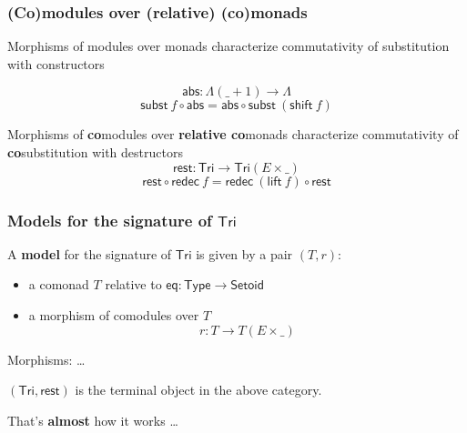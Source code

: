 \documentclass[
]
{beamer}
\newcommand{\constfont}[1]{\ensuremath{\mathsf{#1}}}
\newcommand{\bind}[2]{{#1}\mathbin{\gg\hspace{-.8ex}=}{#2}}
\newcommand{\Tri}{\constfont{Tri}}
\newcommand{\tail}{\constfont{rest}}
\newcommand{\redec}{\constfont{redec}}
\newcommand{\comp}[2]{\ensuremath{{#2} \circ {#1}}}
\newcommand{\shift}{\constfont{shift}}
\newcommand{\lift}{\constfont{lift}}
\newcommand{\subst}{\constfont{subst}}
\newcommand{\Setoid}{\constfont{Setoid}}
\newcommand{\eq}{\ensuremath{\mathsf{eq}}}
\newcommand{\App}{\constfont{app}}
\newcommand{\Abs}{\constfont{abs}}
\newcommand{\LC}{{\Lambda}}
\newcommand{\Set}{\constfont{Type}}
\newcommand{\fat}[1]{\textbf{#1}}
\begin{document}
\begin{frame}
 \frametitle{(Co)modules over (relative) (co)monads}
 \begin{block}{Morphisms of modules over monads}
   characterize commutativity of substitution with constructors

         \[ \Abs : \LC(\_ + 1) \to \LC \]
         \[ \comp{\Abs}{\subst~f} = \comp{\subst~(\shift~f)}{\Abs} \]
 \end{block}

 \begin{block}{Morphisms of \fat{co}modules over \fat{relative co}monads}
   characterize commutativity of \fat{co}substitution with destructors
         \[\tail : \Tri \to \Tri(E\times \_)\]
         \[\comp{\redec~f}{\tail} = \comp{\tail}{\redec~(\lift~f)} \]
 \end{block} 
\end{frame}

\begin{frame}
 \frametitle{Models for the signature of $\Tri$}
  \begin{definition}
    A \fat{model} for the signature of $\Tri$ is given by a pair $(T,r)$:
    \begin{itemize}
     \item a comonad $T$ relative to $\eq: \Set \to \Setoid$
     \item a morphism of comodules over $T$
        \[  r : T \to T(E \times \_) \]
    \end{itemize}
   Morphisms: \ldots
  \end{definition}

 \begin{lemma}
  $(\Tri,\tail)$ is the terminal object in the above category.
 \end{lemma}

 That's \fat{almost} how it works \ldots
  
\end{frame}
\end{document}
